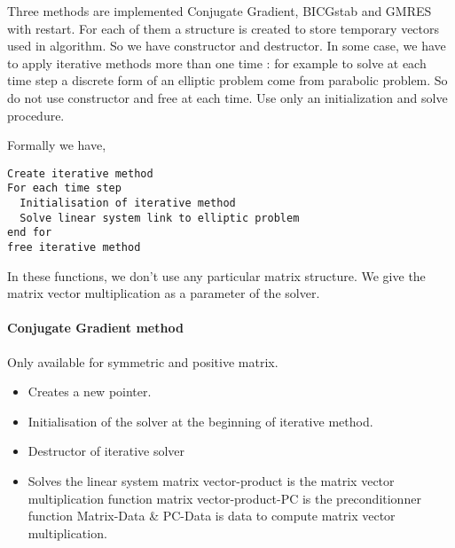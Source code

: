 Three methods are implemented Conjugate Gradient, BICGstab and GMRES with
restart. For each of them a structure is created to store temporary vectors used
in algorithm. So we have constructor and destructor. In some case, we have to
apply iterative methods more than one time : for example to solve at each time
step a discrete form of an elliptic problem come from parabolic problem. So do
not use constructor and free at each time. Use only an initialization and solve
procedure.  

Formally we have, 
\begin{verbatim}
Create iterative method
For each time step
  Initialisation of iterative method
  Solve linear system link to elliptic problem
end for
free iterative method
\end{verbatim}

In these functions, we don't use any particular matrix structure. We give the
matrix vector multiplication as a parameter of the solver. 

\paragraph{Conjugate Gradient method}

Only available for symmetric and positive matrix.
\begin{itemize}
\item 
  \sshortdescribe Creates a new  pointer.  
\item {}
  \sshortdescribe Initialisation of the solver at the beginning of iterative method.  
\item {}
  \sshortdescribe Destructor of iterative solver  
\item {}
  \sshortdescribe Solves the linear system matrix vector-product is the matrix vector multiplication function matrix vector-product-PC is the preconditionner function Matrix-Data \& PC-Data is data to compute matrix vector multiplication.  
\end{itemize}
